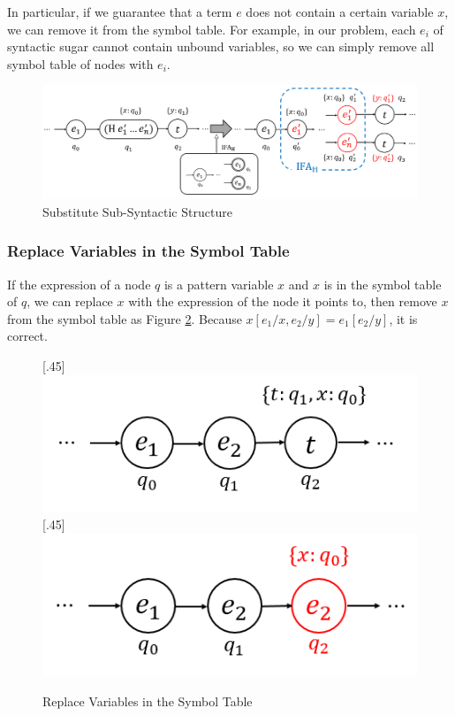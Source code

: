 In particular, if we guarantee that a term $e$ does not contain a certain variable $x$, we can remove it from the symbol table. For example, in our problem, each $e_i$ of syntactic sugar cannot contain unbound variables, so we can simply remove all symbol table of nodes with $e_i$.

\begin{figure}[t]
    \centering
    \includegraphics[scale=0.25]{images/nmlifa/nmlifa-subst.png}
    \caption{Substitute Sub-Syntactic Structure}
    \label{fig:nmlifa-subst}
\end{figure}

\subsubsection{Replace Variables in the Symbol Table}

If the expression of a node $q$ is a pattern variable $x$ and $x$ is in the symbol table of $q$, we can replace $x$ with the expression of the node it points to, then remove $x$ from the symbol table as Figure \ref{fig:nmlifa-replace}. Because $x[e_1/x, e_2/y]=e_1[e_2/y]$, it is correct.

\begin{figure}[t]
\centering
{}[.45\linewidth]{
    \includegraphics[scale=0.25]{images/nmlifa/nmlifa-replace-1.png}
}
[.45\linewidth]{
    \includegraphics[scale=0.25]{images/nmlifa/nmlifa-replace-2.png}
}
\caption{Replace Variables in the Symbol Table}
\label{fig:nmlifa-replace}
\end{figure}

